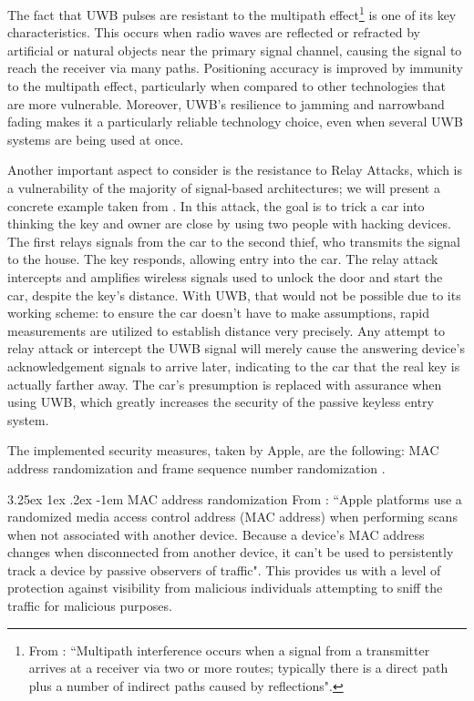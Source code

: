 \documentclass[english]{article}
\makeatletter
\newcounter{subsubsubsection}[subsubsection]
\renewcommand\paragraph{\@startsection{paragraph}{5}{\z@}%
  {3.25ex \@plus1ex \@minus.2ex}%
  {-1em}%
  {\normalfont\normalsize\bfseries}}
\makeatother
\begin{document}
The fact that UWB pulses are resistant to the multipath effect\footnote{From \cite{Figueroa2022}: ``Multipath interference occurs when a signal from a transmitter arrives at a receiver via two or more routes; typically there is a direct path plus a number of indirect paths caused by reflections".} is one of its key characteristics. This occurs when radio waves are reflected or refracted by artificial or natural objects near the primary signal channel, causing the signal to reach the receiver via many paths. Positioning accuracy is improved by immunity to the multipath effect, particularly when compared to other technologies that are more vulnerable. Moreover, UWB's resilience to jamming and narrowband fading makes it a particularly reliable technology choice, even when several UWB systems are being used at once.

Another important aspect to consider is the resistance to Relay Attacks, which is a vulnerability of the majority of signal-based architectures; we will present a concrete example taken from \cite{Global_2020}. In this attack, the goal is to trick a car into thinking the key and owner are close by using two people with hacking devices. The first relays signals from the car to the second thief, who transmits the signal to the house. The key responds, allowing entry into the car. The relay attack intercepts and amplifies wireless signals used to unlock the door and start the car, despite the key's distance. With UWB, that would not be possible due to its working scheme: to ensure the car doesn't have to make assumptions, rapid measurements are utilized to establish distance very precisely. Any attempt to relay attack or intercept the UWB signal will merely cause the answering device's acknowledgement signals to arrive later, indicating to the car that the real key is actually farther away. The car's presumption is replaced with assurance when using UWB, which greatly increases the security of the passive keyless entry system.

The implemented security measures, taken by Apple, are the following: MAC address randomization and frame sequence number randomization \cite{aps}.

\paragraph{MAC address randomization}
From \cite{aps}: ``Apple platforms use a randomized media access control address (MAC address) when performing scans when not associated with another device. Because a device’s MAC address changes when disconnected from another device, it can’t be used to persistently track a device by passive observers of traffic". This provides us with a level of protection against visibility from malicious individuals attempting to sniff the traffic for malicious purposes.
\end{document}
